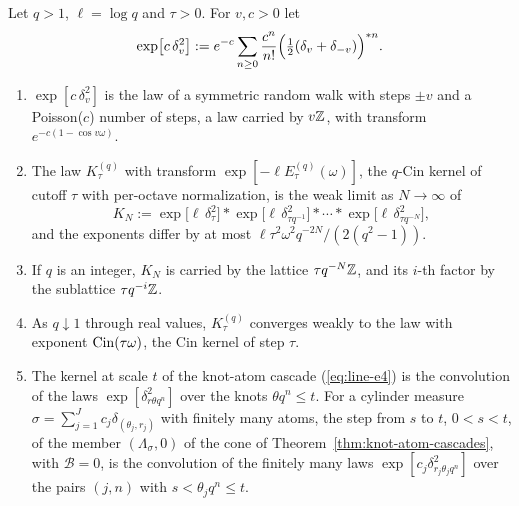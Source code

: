 \begin{proposition}
\label{prop:extreme-rays-random-walks}
\leanok
{}
Let $q > 1$, $\ell = \log q$ and $\tau > 0$. For $v, c > 0$ let
\begin{equation}\label{eq:line-e9}
  \exp\bigl[c\,\delta^2_v\bigr] := e^{-c}\sum_{n \ge 0}\frac{c^n}{n!}
  \Bigl(\tfrac12(\delta_v + \delta_{-v})\Bigr)^{*n}.
\end{equation}
\begin{enumerate}
\item $\exp[c\,\delta^2_v]$ is the law of a symmetric random walk with steps $\pm v$ and a
Poisson($c$) number of steps, a law carried by $v\mathbb{Z}$, with transform $e^{-c(1 - \cos v\omega)}$.
\item The law $K^{(q)}_\tau$ with transform $\exp[-\ell E^{(q)}_\tau(\omega)]$, the $q$-Cin kernel of
cutoff $\tau$ with per-octave normalization, is the weak limit as $N \to \infty$ of
\[
  K_N := \exp\bigl[\ell\,\delta^2_\tau\bigr] * \exp\bigl[\ell\,\delta^2_{\tau q^{-1}}\bigr] * \cdots *
  \exp\bigl[\ell\,\delta^2_{\tau q^{-N}}\bigr],
\]
and the exponents differ by at most $\ell\tau^2\omega^2q^{-2N}/(2(q^2 - 1))$.
\item If $q$ is an integer, $K_N$ is carried by the lattice $\tau q^{-N}\mathbb{Z}$, and its $i$-th factor
by the sublattice $\tau q^{-i}\mathbb{Z}$.
\item As $q \downarrow 1$ through real values, $K^{(q)}_\tau$ converges weakly to the law with
exponent $\operatorname{Cin}(\tau\omega)$, the Cin kernel of step $\tau$.
\item The kernel at scale $t$ of the knot-atom cascade (\ref{eq:line-e4}) is the convolution of the laws
$\exp[\delta^2_{r\theta q^n}]$ over the knots $\theta q^n \le t$. For a cylinder measure
$\sigma = \sum_{j=1}^Jc_j\delta_{(\theta_j, r_j)}$ with finitely many atoms, the step from $s$ to $t$,
$0 < s < t$, of the member $(\Lambda_\sigma, 0)$ of the cone of
Theorem~\ref{thm:knot-atom-cascades}, with $\mathcal{B} = 0$, is the convolution of the finitely
many laws $\exp[c_j\delta^2_{r_j\theta_jq^n}]$ over the pairs $(j, n)$
with $s < \theta_jq^n \le t$.
\end{enumerate}

\end{proposition}
